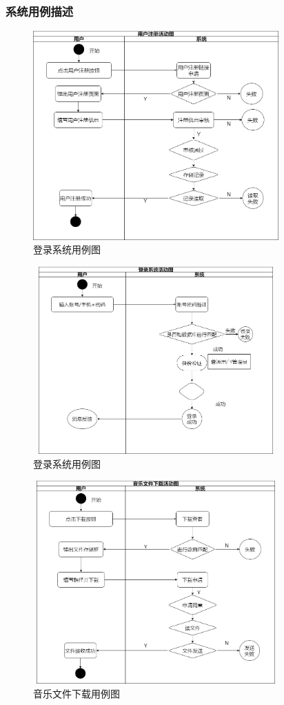 \documentclass[UTF8,14pt]{article}
\numberwithin{figure}{subsubsection}
\numberwithin{table}{subsubsection}
\begin{document}
\subsubsection{系统用例描述}
\vspace*{-1cm}
\begin{figure}[H]
	\centering
	\includegraphics[width=9.41cm,height=8.03cm]{用例图4.png}
	\caption{登录系统用例图}
\end{figure}
\vspace*{-1cm}
\begin{figure}[H]
	\centering
	\includegraphics[width=9.41cm,height=7.2cm]{用例1.png}
	\caption{登录系统用例图}
\end{figure}
\vspace*{-1cm}
\begin{figure}[H]
	\centering
	\includegraphics[width=9.41cm,height=7.8cm]{用例图2.png}
	\caption{音乐文件下载用例图}
\end{figure}
\end{document}
